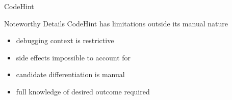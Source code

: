 \begin{frame}{CodeHint}
  \begin{block}{Noteworthy Details}
    CodeHint has limitations outside its manual nature

    \begin{itemize}
      \item debugging context is restrictive
      \item side effects impossible to account for
      \item candidate differentiation is manual
      \item full knowledge of desired outcome required
    \end{itemize}
  \end{block}
\end{frame}
